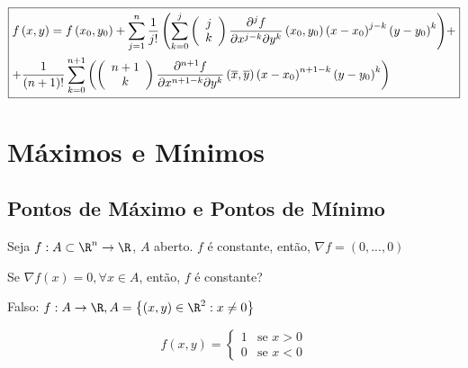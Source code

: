 \documentclass[11pt, oneside, a4paper]{gsm-l}
\begin{document}
\[\boxed{
\begin{gathered}
  f\left( {x,y} \right) = f\left( {x_0 ,y_0 } \right) + \sum\limits_{j = 1}^n {\frac{1}
{{j!}}\left( {\sum\limits_{k = 0}^j {\left( {\begin{array}{*{20}c}
j  \\
k  \\

\end{array} } \right)\frac{{\partial ^j f}}
{{\partial x^{j - k} \partial y^k }}\left( {x_0 ,y_0 } \right)\left( {x - x_0 } \right)^{j - k} \left( {y - y_0 } \right)^k } } \right)}  +  \hfill \\
+ \frac{1}
{{\left( {n + 1} \right)!}}\sum\limits_{k = 0}^{n + 1} {\left( {\left( {\begin{array}{*{20}c}
{n + 1}  \\
k  \\

\end{array} } \right)\frac{{\partial ^{n + 1} f}}
{{\partial x^{n + 1 - k} \partial y^k }}\left( {\overline x ,\overline y } \right)\left( {x - x_0 } \right)^{n + 1 - k} \left( {y - y_0 } \right)^k } \right)}  \hfill \\
\end{gathered}
}\]


\chapter{Máximos e Mínimos} \label{chap04}

\section{Pontos de Máximo e Pontos de Mínimo} \label{sec20}

Seja $f:A \subset \R^n \to \R$, $A$ aberto. $f$ é constante, então, $\nabla f = \left( {0,...,0} \right)$

Se $\nabla f(x) = 0, \forall x \in A$, então, $f$ é constante?

Falso: $f:A \to \R, A = \left\{ {\left( {x,y} \right) \in \R^2 :x \ne 0} \right\}$

\begin{equation*}
f(x,y)=\left\{ \begin{array}{cl}\displaystyle
1 & \textrm{se } x > 0\\
0 & \textrm{se } x< 0 \end{array}\right.
\end{equation*}
\end{document}
